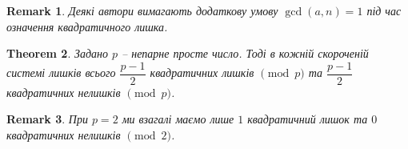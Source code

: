 \documentclass[a4paper, 10pt]{article}
\theoremstyle{theoremdd}
\newtheorem{theorem}{Theorem}[subsection]
\theoremstyle{theoremdd}
\theoremstyle{theoremdd}
\theoremstyle{theoremdd}
\newtheorem{example}[theorem]{Example}
\theoremstyle{theoremdd}
\theoremstyle{theoremdd}
\newtheorem{remark}[theorem]{Remark}
\theoremstyle{theoremdd}
\theoremstyle{theoremdd}
\begin{document}

\begin{remark}
Деякі автори вимагають додаткову умову $\gcd(a,n) = 1$ під час означення квадратичного лишка.
\end{remark}

\begin{theorem}
Задано $p$ -- непарне просте число. Тоді в кожній скороченій системі лишків всього $\dfrac{p-1}{2}$ квадратичних лишків $\!\! \pmod p$ та $\dfrac{p-1}{2}$ квадратичних нелишків $\!\! \pmod p$.
\end{theorem}

\begin{remark}
При $p =2$ ми взагалі маємо лише $1$ квадратичний лишок та $0$ квадратичних нелишків $\!\! \pmod 2$.
\end{remark}
\end{document}
